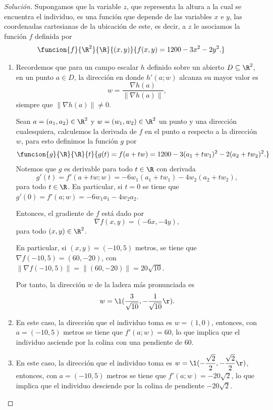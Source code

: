 \documentclass[a4,11pt]{aleph-notas}
\begin{document}
\begin{proof}[Solución]
Supongamos que la variable $z$, que representa la altura a la cual se encuentra el individuo, es una función que depende de las variables $x$ e $y$, las coordenadas cartesianas de la ubicación de este, es decir, a $z$ le asociamos la función $f$ definida por
    \[
        \funcion{f}{\R^2}{\R}
        {(x, y)}{f(x, y) = 1200 - 3x^2 - 2y^2.}
    \]

    \begin{enumerate}
    \item 
        Recordemos que para un campo escalar $h$ definido sobre un abierto $D\subseteq\R^2$, en un punto $a\in D$, la dirección en donde $h'(a;w)$ alcanza su mayor valor es
        \[
            w = \frac{\nabla h(a)}{\|\nabla h(a)\|},
        \]
        siempre que $\|\nabla h(a)\|\neq 0$.

        Sean $a = (a_1, a_2)\in\R^2$ y $w = (w_1, w_2)\in\R^2$ un punto y una dirección cualesquiera, calculemos la derivada de $f$ en el punto $a$ respecto a la dirección $w$, para esto definimos la función $g$ por
        \[
            \funcion{g}{\R}{\R}
            {t}{g(t) = f(a + tw) = 1200 - 3(a_1 + tw_1)^2 - 2(a_2 + tw_2)^2.}
        \]
        Notemos que $g$ es derivable para todo $t\in\R$ con derivada
        \[
            g'(t) = f'(a + tw; w) = - 6w_1(a_1 + tw_1) - 4w_2(a_2 + tw_2),
        \]
        para todo $t\in\R$. En particular, si $t=0$ se tiene que $g'(0) = f'(a;w) = - 6w_1 a_1 - 4w_2 a_2$.

        Entonces, el gradiente de $f$ está dado por
        \[
            \nabla f(x, y) = (- 6x , - 4y),
        \]
        para todo $(x, y)\in\R^2$. 

        En particular, si $(x, y) = (-10, 5)$ metros, se tiene que $\nabla f(-10, 5) = (60 , - 20)$, con $\|\nabla f(-10, 5)\| = \|(60 , - 20)\| = 20\sqrt{10}$. 

        Por tanto, la dirección $w$ de la ladera más pronunciada es
        \[
            w = \l(\dfrac{3}{\sqrt{10}}, -\dfrac{1}{\sqrt{10}}\r).
        \]
    \item 
        En este caso, la dirección que el individuo toma es $w = (1, 0)$, entonces, con $a = (-10, 5)$ metros se tiene que $f'(a;w) = 60$, lo que implica que el individuo asciende por la colina con una pendiente de $60$.
    \item 
        En este caso, la dirección que el individuo toma es $w = \l(-\dfrac{\sqrt{2}}{2},-\dfrac{\sqrt{2}}{2}\r)$, entonces, con $a = (-10, 5)$ metros se tiene que $f'(a;w) = -20\sqrt{2}$, lo que implica que el individuo desciende por la colina de pendiente $-20\sqrt{2}$.
    \end{enumerate}
\end{proof}
\end{document}
